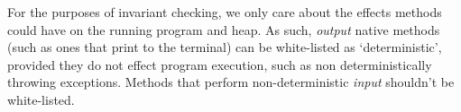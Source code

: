 For the purposes of invariant checking, we only care about the effects methods could have on the running program and heap. As such, \emph{output} native methods (such as ones that print to the terminal) can be white-listed as `deterministic', provided they do not effect program execution, such as non deterministically throwing  exceptions. Methods that perform non-deterministic \emph{input} shouldn't be white-listed.%



